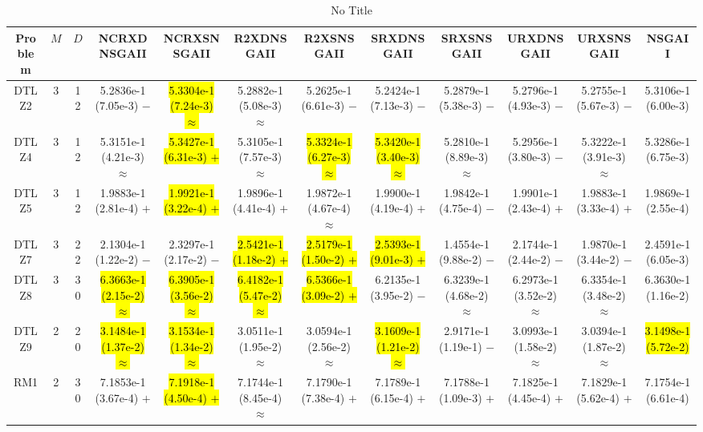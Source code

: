 \documentclass[journal]{IEEEtran}
\begin{document}
\begin{table*}[htbp]
\renewcommand{\arraystretch}{1.2}
\centering
\caption{No Title}
\begin{tabular}{cccccccccccc}
\toprule
Problem&$M$&$D$&NCRXDNSGAII&NCRXSNSGAII&R2XDNSGAII&R2XSNSGAII&SRXDNSGAII&SRXSNSGAII&URXDNSGAII&URXSNSGAII&NSGAII\\
\midrule
\multirow{1}{*}{DTLZ2}&3&12&5.2836e-1 (7.05e-3) $-$&\hl{5.3304e-1 (7.24e-3) $\approx$}&5.2882e-1 (5.08e-3) $\approx$&5.2625e-1 (6.61e-3) $-$&5.2424e-1 (7.13e-3) $-$&5.2879e-1 (5.38e-3) $-$&5.2796e-1 (4.93e-3) $-$&5.2755e-1 (5.67e-3) $-$&5.3106e-1 (6.00e-3)\\
\hline
\multirow{1}{*}{DTLZ4}&3&12&5.3151e-1 (4.21e-3) $\approx$&\hl{5.3427e-1 (6.31e-3) $+$}&5.3105e-1 (7.57e-3) $\approx$&\hl{5.3324e-1 (6.27e-3) $\approx$}&\hl{5.3420e-1 (3.40e-3) $\approx$}&5.2810e-1 (8.89e-3) $\approx$&5.2956e-1 (3.80e-3) $-$&5.3222e-1 (3.91e-3) $\approx$&5.3286e-1 (6.75e-3)\\
\hline
\multirow{1}{*}{DTLZ5}&3&12&1.9883e-1 (2.81e-4) $+$&\hl{1.9921e-1 (3.22e-4) $+$}&1.9896e-1 (4.41e-4) $+$&1.9872e-1 (4.67e-4) $\approx$&1.9900e-1 (4.19e-4) $+$&1.9842e-1 (4.75e-4) $-$&1.9901e-1 (2.43e-4) $+$&1.9883e-1 (3.33e-4) $+$&1.9869e-1 (2.55e-4)\\
\hline
\multirow{1}{*}{DTLZ7}&3&22&2.1304e-1 (1.22e-2) $-$&2.3297e-1 (2.17e-2) $-$&\hl{2.5421e-1 (1.18e-2) $+$}&\hl{2.5179e-1 (1.50e-2) $+$}&\hl{2.5393e-1 (9.01e-3) $+$}&1.4554e-1 (9.88e-2) $-$&2.1744e-1 (2.44e-2) $-$&1.9870e-1 (3.44e-2) $-$&2.4591e-1 (6.05e-3)\\
\hline
\multirow{1}{*}{DTLZ8}&3&30&\hl{6.3663e-1 (2.15e-2) $\approx$}&\hl{6.3905e-1 (3.56e-2) $\approx$}&\hl{6.4182e-1 (5.47e-2) $\approx$}&\hl{6.5366e-1 (3.09e-2) $+$}&6.2135e-1 (3.95e-2) $-$&6.3239e-1 (4.68e-2) $\approx$&6.2973e-1 (3.52e-2) $\approx$&6.3354e-1 (3.48e-2) $\approx$&6.3630e-1 (1.16e-2)\\
\hline
\multirow{1}{*}{DTLZ9}&2&20&\hl{3.1484e-1 (1.37e-2) $\approx$}&\hl{3.1534e-1 (1.34e-2) $\approx$}&3.0511e-1 (1.95e-2) $\approx$&3.0594e-1 (2.56e-2) $\approx$&\hl{3.1609e-1 (1.21e-2) $\approx$}&2.9171e-1 (1.19e-1) $-$&3.0993e-1 (1.58e-2) $\approx$&3.0394e-1 (1.87e-2) $\approx$&\hl{3.1498e-1 (5.72e-2)}\\
\hline
\multirow{1}{*}{RM1}&2&30&7.1853e-1 (3.67e-4) $+$&\hl{7.1918e-1 (4.50e-4) $+$}&7.1744e-1 (8.45e-4) $\approx$&7.1790e-1 (7.38e-4) $+$&7.1789e-1 (6.15e-4) $+$&7.1788e-1 (1.09e-3) $+$&7.1825e-1 (4.45e-4) $+$&7.1829e-1 (5.62e-4) $+$&7.1754e-1 (6.61e-4)\\

\end{tabular}
\end{table*}
\end{document}
